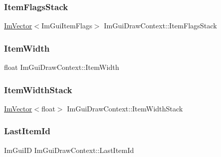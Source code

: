 \subsubsection{\texorpdfstring{Item\+Flags\+Stack}{ItemFlagsStack}}
{\footnotesize\ttfamily \hyperlink{class_im_vector}{Im\+Vector}$<$Im\+Gui\+Item\+Flags$>$ Im\+Gui\+Draw\+Context\+::\+Item\+Flags\+Stack}

\hypertarget{struct_im_gui_draw_context_a6327a65273ded49b6aa309167fca4b9e}{}\label{struct_im_gui_draw_context_a6327a65273ded49b6aa309167fca4b9e} 
\subsubsection{\texorpdfstring{Item\+Width}{ItemWidth}}
{\footnotesize\ttfamily float Im\+Gui\+Draw\+Context\+::\+Item\+Width}

\hypertarget{struct_im_gui_draw_context_af6420717337b44394ad7ccbe55446db2}{}\label{struct_im_gui_draw_context_af6420717337b44394ad7ccbe55446db2} 
\subsubsection{\texorpdfstring{Item\+Width\+Stack}{ItemWidthStack}}
{\footnotesize\ttfamily \hyperlink{class_im_vector}{Im\+Vector}$<$float$>$ Im\+Gui\+Draw\+Context\+::\+Item\+Width\+Stack}

\hypertarget{struct_im_gui_draw_context_ad864847097dd259ce9cb69558173fe45}{}\label{struct_im_gui_draw_context_ad864847097dd259ce9cb69558173fe45} 
\subsubsection{\texorpdfstring{Last\+Item\+Id}{LastItemId}}
{\footnotesize\ttfamily Im\+Gui\+ID Im\+Gui\+Draw\+Context\+::\+Last\+Item\+Id}

\hypertarget{struct_im_gui_draw_context_a214683a9c08e5812a492881791cd2f51}{}\label{struct_im_gui_draw_context_a214683a9c08e5812a492881791cd2f51} 
